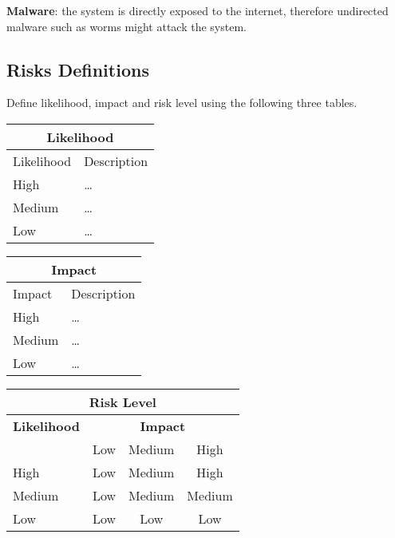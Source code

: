 \documentclass[english]{article}
\begin{document}
\textbf{Malware}: the system is directly exposed to the internet, therefore undirected malware such as worms might attack the system. 

\subsection{Risks Definitions}

Define likelihood, impact and risk level using the following three
  tables.


\begin{center}
\begin{tabular}{|l|l|}
\hline
\multicolumn{2}{|c|}{\bf Likelihood} \\
\hline
Likelihood & Description \\
\hline
\hline
High   & \hspace*{20pt}\ldots \\
\hline
Medium & \hspace*{20pt}\ldots \\
\hline
Low   & \hspace*{20pt}\ldots \\
\hline
\end{tabular}
\hspace{3em}
\begin{tabular}{|l|l|}
\hline
\multicolumn{2}{|c|}{\bf Impact} \\
\hline
Impact & Description \\
\hline
\hline
High   & \hspace*{20pt}\ldots \\
\hline
Medium & \hspace*{20pt}\ldots \\
\hline
Low   & \hspace*{20pt}\ldots \\
\hline
\end{tabular}
\end{center}

\vspace{5mm}

\begin{center}
\begin{tabular}{|l|c|c|c|}
\hline
\multicolumn{4}{|c|}{{\bf Risk Level}} \\
\hline
{{\bf Likelihood}} & \multicolumn{3}{c|}{{\bf Impact}} \\ %
     & Low & Medium & High \\  \hline
 High & Low & Medium & High  \\
\hline
 Medium & Low & Medium & Medium \\
\hline
 Low & Low & Low & Low \\
\hline
\end{tabular}
\end{center}
\end{document}
